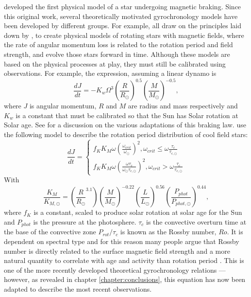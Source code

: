 \citet{Kawaler1988} developed the first physical model of a star undergoing
magnetic braking.
Since this original work, several theoretically motivated gyrochronology
models have been developed by different groups.
For example, \citet{Collier-cameron1994, Reiners2012, Vansaders2013,
Epstein2014} all draw on the principles laid down by \citet{Kawaler1988}, to
create physical models of rotating stars with magnetic fields, where the rate
of angular momentum loss is related to the rotation period and field strength,
and evolve those stars forward in time.
Although these models are based on the physical processes at play, they must
still be calibrated using observations.
For example, the \citet{Kawaler1988} expression, assuming a linear dynamo is
\begin{equation}
\frac{dJ}{dt} = -K_w\Omega^3\left(\frac{R}{R_\odot}\right)^{0.5}
\left(\frac{M}{M_\odot}\right)^{-0.5},
\end{equation}
where $J$ is angular momentum, $R$ and $M$ are radius and mass respectively
and $K_w$ is a constant that must be calibrated so that the Sun has Solar
rotation at Solar age.
See \citet{Barnes2010b} for a discussion on the various adaptations of this
braking law.
\citet{Vansaders2013} use the following model to describe the rotation period
distribution of cool field stars:
\begin{equation}
\frac{dJ}{dt} = \left\{
                \begin{array}{ll}
                  f_K K_M \omega \left( \frac{\omega_{crit}}{\omega_\odot}
                  \right)^2, \omega_{crit} \leq \omega
                  \frac{\tau_{c}}{\tau_{c, \odot}} \\
                  f_K K_M \omega \left( \frac{\omega\tau_{c}}
                  {\omega_\odot\tau_{c, \odot}}
                  \right)^2, \omega_{crit} > \omega
                  \frac{\tau_{c}}{\tau_{c, \odot}}
                \end{array}
              \right.
\end{equation}
\label{eq:vansaders}
With
\begin{equation}
    \frac{K_M}{K_{M, \odot}} = \left(\frac{R}{R_\odot}^{3.1}\right)
    \left(\frac{M}{M_\odot}\right)^{-0.22}
    \left(\frac{L}{L_\odot}\right)^{0.56}
    \left(\frac{P_{phot}}{P_{phot, \odot}}\right)^{0.44},
\end{equation}
\label{eq:vansaders2}
where $f_K$ is a constant, scaled to produce solar rotation at solar age for
the Sun and $P_{phot}$ is the pressure at the photosphere.
$\tau_c$ is the convective overturn time at the base of the convective zone
$P_{rot}/\tau_c$ is known as the Rossby number, $Ro$.
It is dependent on spectral type and for this reason many people argue that
Rossby number is directly related to the surface magnetic field strength and a
more natural quantity to correlate with age and activity than rotation period
\citep[\eg][]{Vansaders2016} \citep[although this view is not universally
held --- see, \eg][]{Reiners2014}.
This is one of the more recently developed theoretical gyrochronology
relations --- however, as revealed in chapter \ref{chapter:conclusions}, this
equation has now been adapted to describe the most recent observations.

